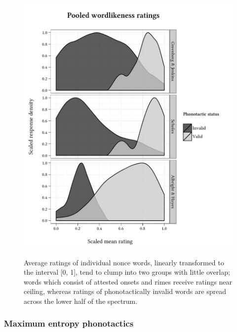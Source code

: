 \begin{figure} \centering \label{density}
\includegraphics{density.pdf}
\caption{Average ratings of individual nonce words, linearly transformed to the interval [0, 1], tend to clump into two groups with little overlap; words which consist of  attested onsets and rimes receive ratings near ceiling, whereas ratings of phonotactically invalid words are spread across the lower half of the spectrum.}
\end{figure}

\subsubsection{Maximum entropy phonotactics}

